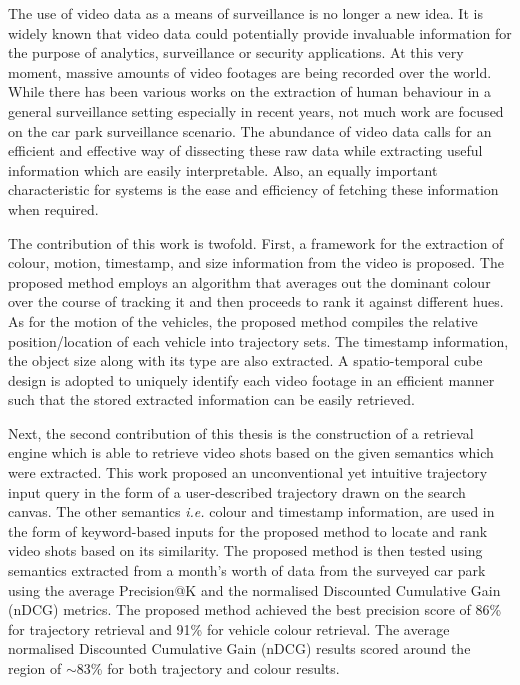 
The use of video data as a means of surveillance is no longer a new idea. It is widely known that video data could potentially provide invaluable information for the purpose of analytics, surveillance or security applications. At this very moment, massive amounts of video footages are being recorded over the world. While there has been various works on the extraction of human behaviour in a general surveillance setting especially in recent years, not much work are focused on the car park surveillance scenario. The abundance of video data calls for an efficient and effective way of dissecting these raw data while extracting useful information which are easily interpretable. Also, an equally important characteristic for systems is the ease and efficiency of fetching these information when required. 

The contribution of this work is twofold. First, a framework for the extraction of colour, motion, timestamp, and size information from the video is proposed. 
The proposed method employs an algorithm that averages out the dominant colour over the course of tracking it and then proceeds to rank it against different hues. 
As for the motion of the vehicles, the proposed method compiles the relative position/location of each vehicle into trajectory sets. The timestamp information, the object size along with its type are also extracted. A spatio-temporal cube design is adopted to uniquely identify each video footage in an efficient manner such that the stored extracted information can be easily retrieved. %

Next, the second contribution of this thesis is the construction of a retrieval engine which is able to retrieve video shots based on the given semantics which were extracted. This work proposed an unconventional yet intuitive trajectory input query in the form of a user-described trajectory drawn on the search canvas. 
The other semantics \emph{i.e.} colour and timestamp information, are used in the form of keyword-based inputs for the proposed method to locate and rank video shots based on its similarity. 
The proposed method is then tested using semantics extracted from a month's worth of data from the surveyed car park 
using the average Precision@K and the normalised Discounted Cumulative Gain (nDCG) metrics. The proposed method achieved the best precision score of 86\% for trajectory retrieval and 91\% for vehicle colour retrieval. %
The average normalised Discounted Cumulative Gain (nDCG) results scored around the region of $\sim$83\% for both trajectory and colour results. 

